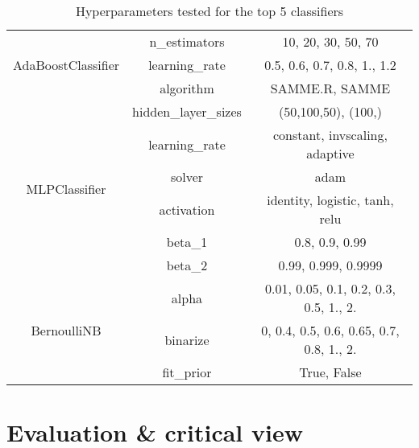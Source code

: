 \documentclass[12pt]{article}
\begin{document}
\begin{table}[ht]
\begin{tabular}{ccc}
        \midrule
        \multirow{3}{*}{AdaBoostClassifier}         & n\_estimators           & 10, 20, 30, 50, 70                       \\
                                                    & learning\_rate          & 0.5, 0.6, 0.7, 0.8, 1., 1.2              \\
                                                    & algorithm               & SAMME.R, SAMME                           \\
        \midrule
        \multirow{6}{*}{MLPClassifier}              & hidden\_layer\_sizes    & (50,100,50), (100,)                      \\
                                                    & learning\_rate          & constant, invscaling, adaptive           \\
                                                    & solver                  & adam                                     \\
                                                    & activation              & identity, logistic, tanh, relu           \\
                                                    & beta\_1                 & 0.8, 0.9, 0.99                           \\
                                                    & beta\_2                 & 0.99, 0.999, 0.9999                      \\
        \midrule
        \multirow{3}{*}{BernoulliNB}                & alpha                   & 0.01, 0.05, 0.1, 0.2, 0.3, 0.5, 1., 2.   \\
                                                    & binarize                & 0, 0.4, 0.5, 0.6, 0.65, 0.7, 0.8, 1., 2. \\
                                                    & fit\_prior              & True, False                              \\
        \bottomrule
    \end{tabular}
    \caption{Hyperparameters tested for the top 5 classifiers}
    \label{table: hyperparameters tested}
\end{table}

\section{Evaluation \& critical view}

\clearpage

\printnoidxglossaries
\end{document}
